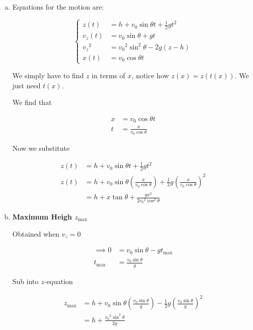 \begin{sol}
	\begin{enumerate}[a)]
		\item Equations for the motion are:
		
		\begin{equation}
			\begin{cases}
				z(t) &= h + v_0 \sin\theta t + \frac{1}{2} g t^2\\
				v_z(t) &= v_0 \sin\theta + gt\\
				{v_z}^2 &= {v_0}^2 \sin^2\theta - 2g(z-h)\\
				x(t) &= v_0 \cos\theta t
			\end{cases}
		\end{equation}

		We simply have to find $z$ in terms of $x$, notice how $z(x) = z(t(x))$. We just need $t(x)$.

		We find that 

		\begin{align}
			x &= v_0\cos\theta t\\
			t &= \frac{x}{v_0\cos\theta}
		\end{align}

		Now we substitute

		\begin{align}
			z(t) &= h + v_0 \sin\theta t + \frac{1}{2} g t^2\\
			z(t) &= h + v_0 \sin\theta \left(\frac{x}{v_0\cos\theta}\right) + \frac{1}{2} g \left(\frac{x}{v_0\cos\theta}\right)^2\\
			&= \boxed{h + x\tan\theta + \frac{gx^2}{2{v_0}^2\cos^2\theta}}
		\end{align}

		\item \textbf{Maximum Heigh $z_{\mathrm{max}}$}
		
		Obtained when $v_z = 0$
		
		\begin{align}
			\implies 0 &= v_0 \sin\theta - gt_{\mathrm{max}}\\
			t_{\mathrm{max}} &= \frac{v_0 \sin\theta}{g}
		\end{align}

		Sub into $z$-equation

		\begin{align}
			z_{\mathrm{max}} &= h + v_0\sin\theta\left(\frac{v_0\sin\theta}{g}\right) - \frac{1}{2} g \left(\frac{v_0\sin\theta}{g}\right)^2\\
			&= \boxed{h + \frac{{v_0}^2\sin^2\theta}{2g}}
		\end{align}


\end{enumerate}
\end{sol}
